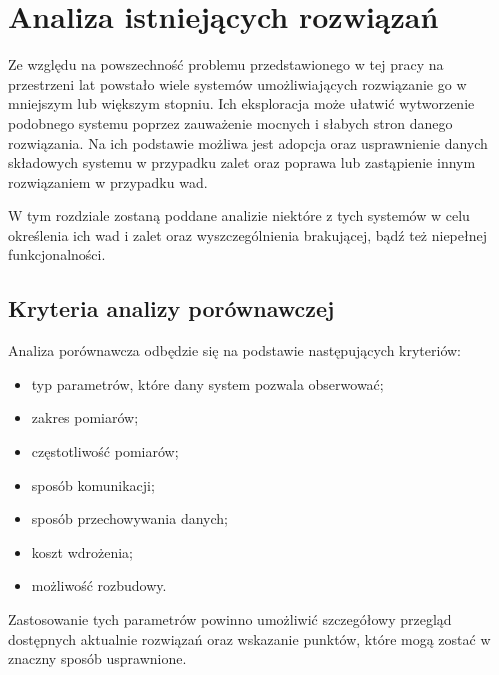 \chapter{Analiza istniejących rozwiązań}
Ze względu na powszechność problemu przedstawionego w tej pracy na przestrzeni lat powstało wiele 
systemów umożliwiających rozwiązanie go w mniejszym lub większym stopniu. 
Ich eksploracja może ułatwić wytworzenie podobnego systemu poprzez zauważenie mocnych i słabych
stron danego rozwiązania. Na ich podstawie możliwa jest adopcja oraz usprawnienie danych składowych
systemu w przypadku zalet oraz poprawa lub zastąpienie innym rozwiązaniem w przypadku wad.


W tym rozdziale zostaną poddane analizie niektóre z tych systemów w celu określenia ich 
wad i zalet oraz wyszczególnienia brakującej, bądź też niepełnej funkcjonalności.

\section{Kryteria analizy porównawczej}
Analiza porównawcza odbędzie się na podstawie następujących kryteriów:
\begin{itemize}
  \item typ parametrów, które dany system pozwala obserwować;
  \item zakres pomiarów;
  \item częstotliwość pomiarów;
  \item sposób komunikacji;
  \item sposób przechowywania danych;
  \item koszt wdrożenia;
  \item możliwość rozbudowy.
\end{itemize}
Zastosowanie tych parametrów powinno umożliwić szczegółowy przegląd dostępnych aktualnie
rozwiązań oraz wskazanie punktów, które mogą zostać w znaczny sposób usprawnione.

